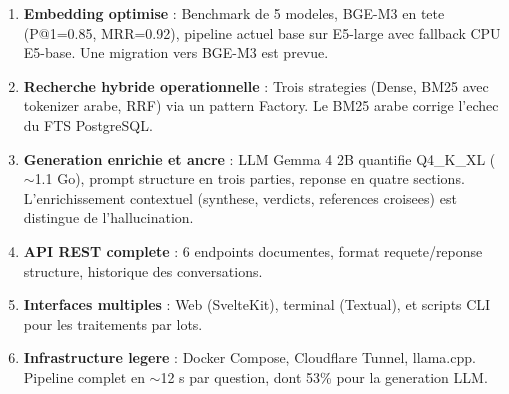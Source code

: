 \begin{enumerate}
    \item \textbf{Embedding optimise} : Benchmark de 5 modeles, BGE-M3 en tete (P@1=0.85, MRR=0.92), pipeline actuel base sur E5-large avec fallback CPU E5-base. Une migration vers BGE-M3 est prevue.

    \item \textbf{Recherche hybride operationnelle} : Trois strategies (Dense, BM25 avec tokenizer arabe, RRF) via un pattern Factory. Le BM25 arabe corrige l'echec du FTS PostgreSQL.

    \item \textbf{Generation enrichie et ancre} : LLM Gemma 4 2B quantifie Q4\_K\_XL ($\sim$1.1 Go), prompt structure en trois parties, reponse en quatre sections. L'enrichissement contextuel (synthese, verdicts, references croisees) est distingue de l'hallucination.

    \item \textbf{API REST complete} : 6 endpoints documentes, format requete/reponse structure, historique des conversations.

    \item \textbf{Interfaces multiples} : Web (SvelteKit), terminal (Textual), et scripts CLI pour les traitements par lots.

    \item \textbf{Infrastructure legere} : Docker Compose, Cloudflare Tunnel, llama.cpp. Pipeline complet en $\sim$12 s par question, dont 53\% pour la generation LLM.
\end{enumerate}